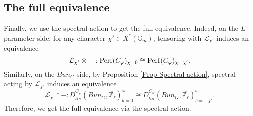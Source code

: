 \subsection{The full equivalence}	

Finally, we use the spectral action to get the full equivalence. Indeed, on the $L$-parameter side, for any character $\chi' \in X^*(\mathbb{G}_m)$, tensoring with $\mathcal{\mathcal{L}_{\chi'}}$ induces an equivalence
$$\mathcal{\mathcal{L}_{\chi'}} \otimes -: \operatorname{\operatorname{Perf}}(C_{\varphi})_{\chi=0} \cong \operatorname{\operatorname{Perf}}(C_{\varphi})_{\chi=\chi'}.$$
Similarly, on the $Bun_G$ side, by Proposition \ref{Prop Spectral action}, spectral acting by $\mathcal{\mathcal{L}_{\chi'}}$ induces an equivalence
$$\mathcal{\mathcal{L}_{\chi'}}*-: D_{lis}^{C_{\varphi}}(Bun_G, \overline{\mathbb{Z}_{\ell}})^{\omega}_{b=0} \cong D_{lis}^{C_{\varphi}}(Bun_G, \overline{\mathbb{Z}_{\ell}})^{\omega}_{b=-\chi'}.$$ Therefore, we get the full equivalence via the spectral action.
	
